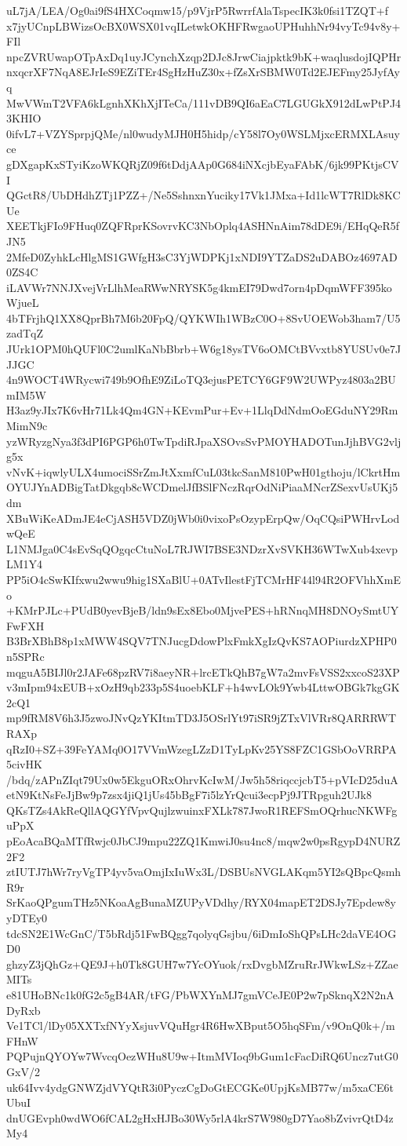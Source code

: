 uL7jA/LEA/Og0ai9fS4HXCoqmw15/p9VjrP5RwrrfAlaTspecIK3k0fsi1TZQT+f
x7jyUCnpLBWizsOcBX0WSX01vqILetwkOKHFRwgaoUPHuhhNr94vyTc94v8y+FIl
npcZVRUwapOTpAxDq1uyJCynchXzqp2DJc8JrwCiajpktk9bK+waqlusdojIQPHr
nxqcrXF7NqA8EJrIeS9EZiTEr4SgHzHuZ30x+fZsXrSBMW0Td2EJEFmy25JyfAyq
MwVWmT2VFA6kLgnhXKhXjITeCa/111vDB9QI6aEaC7LGUGkX912dLwPtPJ43KHIO
0ifvL7+VZYSprpjQMe/nl0wudyMJH0H5hidp/cY58l7Oy0WSLMjxcERMXLAsuyce
gDXgapKxSTyiKzoWKQRjZ09f6tDdjAAp0G684iNXcjbEyaFAbK/6jk99PKtjsCVI
QGctR8/UbDHdhZTj1PZZ+/Ne5SshnxnYuciky17Vk1JMxa+Id1lcWT7RlDk8KCUe
XEETkjFIo9FHuq0ZQFRprKSovrvKC3NbOplq4ASHNnAim78dDE9i/EHqQeR5fJN5
2MfeD0ZyhkLcHlgMS1GWfgH3sC3YjWDPKj1xNDI9YTZaDS2uDABOz4697AD0ZS4C
iLAVWr7NNJXvejVrLlhMeaRWwNRYSK5g4kmEI79Dwd7orn4pDqmWFF395koWjueL
4bTFrjhQ1XX8QprBh7M6b20FpQ/QYKWIh1WBzC0O+8SvUOEWob3ham7/U5zadTqZ
JUrk1OPM0hQUFl0C2umlKaNbBbrb+W6g18ysTV6oOMCtBVvxtb8YUSUv0e7JJJGC
4n9WOCT4WRycwi749b9OfhE9ZiLoTQ3ejusPETCY6GF9W2UWPyz4803a2BUmIM5W
H3az9yJIx7K6vHr71Lk4Qm4GN+KEvmPur+Ev+1LlqDdNdmOoEGduNY29RmMimN9c
yzWRyzgNya3f3dPI6PGP6h0TwTpdiRJpaXSOvsSvPMOYHADOTunJjhBVG2vljg5x
vNvK+iqwlyULX4umociSSrZmJtXxmfCuL03tkcSanM810PwH01gthoju/lCkrtHm
OYUJYnADBigTatDkgqb8cWCDmelJfBSlFNczRqrOdNiPiaaMNcrZSexvUsUKj5dm
XBuWiKeADmJE4eCjASH5VDZ0jWb0i0vixoPsOzypErpQw/OqCQsiPWHrvLodwQeE
L1NMJga0C4sEvSqQOgqcCtuNoL7RJWI7BSE3NDzrXvSVKH36WTwXub4xevpLM1Y4
PP5iO4cSwKIfxwu2wwu9hig1SXaBlU+0ATvIlestFjTCMrHF44l94R2OFVhhXmEo
+KMrPJLc+PUdB0yevBjeB/ldn9sEx8Ebo0MjvePES+hRNnqMH8DNOySmtUYFwFXH
B3BrXBhB8p1xMWW4SQV7TNJucgDdowPlxFmkXgIzQvKS7AOPiurdzXPHP0n5SPRc
mqguA5BIJl0r2JAFe68pzRV7i8aeyNR+lrcETkQhB7gW7a2mvFsVSS2xxcoS23XP
v3mIpm94xEUB+xOzH9qb233p5S4uoebKLF+h4wvLOk9Ywb4LttwOBGk7kgGK2cQ1
mp9fRM8V6h3J5zwoJNvQzYKItmTD3J5OSrlYt97iSR9jZTxVlVRr8QARRRWTRAXp
qRzI0+SZ+39FeYAMq0O17VVmWzegLZzD1TyLpKv25YS8FZC1GSbOoVRRPA5civHK
/bdq/zAPnZIqt79Ux0w5EkguORxOhrvKcIwM/Jw5h58riqccjcbT5+pVIcD25duA
etN9KtNsFeJjBw9p7zsx4jiQ1jUs45bBgF7i5lzYrQcui3ecpPj9JTRpguh2UJk8
QKsTZs4AkReQllAQGYfVpvQujlzwuinxFXLk787JwoR1REFSmOQrhucNKWFguPpX
pEoAcaBQaMTfRwjc0JbCJ9mpu22ZQ1KmwiJ0su4nc8/mqw2w0psRgypD4NURZ2F2
ztIUTJ7hWr7ryVgTP4yv5vaOmjIxIuWx3L/DSBUsNVGLAKqm5YI2sQBpcQsmhR9r
SrKaoQPgumTHz5NKoaAgBunaMZUPyVDdhy/RYX04mapET2DSJy7Epdew8yyDTEy0
tdcSN2E1WcGnC/T5bRdj51FwBQgg7qolyqGsjbu/6iDmIoShQPsLHc2daVE4OGD0
ghzyZ3jQhGz+QE9J+h0Tk8GUH7w7YcOYuok/rxDvgbMZruRrJWkwLSz+ZZaeMITs
e81UHoBNc1k0fG2c5gB4AR/tFG/PbWXYnMJ7gmVCeJE0P2w7pSknqX2N2nADyRxb
Ve1TCl/lDy05XXTxfNYyXsjuvVQuHgr4R6HwXBput5O5hqSFm/v9OnQ0k+/mFHnW
PQPujnQYOYw7WvcqOezWHu8U9w+ItmMVIoq9bGum1cFacDiRQ6Uncz7utG0GxV/2
uk64Ivv4ydgGNWZjdVYQtR3i0PyczCgDoGtECGKe0UpjKsMB77w/m5xaCE6tUbuI
dnUGEvph0wdWO6fCAL2gHxHJBo30Wy5rlA4krS7W980gD7Yao8bZvivrQtD4zMy4

